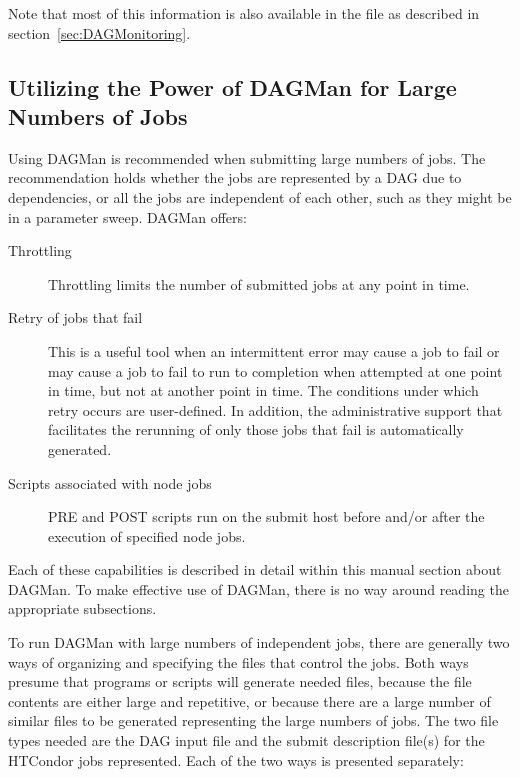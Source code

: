 Note that most of this information is also available in the
 file as described in section~\ref{sec:DAGMonitoring}.

\subsection{\label{sec:DAGLotsaJobs}Utilizing the Power of DAGMan for Large Numbers of Jobs}

Using DAGMan is recommended when submitting large numbers of jobs.
The recommendation holds whether the jobs are represented by
a DAG due to dependencies, or all the jobs are
independent of each other, such as they might be in a parameter sweep.
DAGMan offers:
\begin{description}
\item[Throttling]
  Throttling limits the number of submitted jobs at any point in time.
\item[Retry of jobs that fail]
  This is a useful tool when an intermittent error may cause a job to fail
  or may cause a job to fail to run to completion when attempted at 
  one point in time,
  but not at another point in time.
  The conditions under which retry occurs are user-defined.
  In addition, the administrative support that facilitates the
  rerunning of only those jobs that fail is automatically generated.
\item[Scripts associated with node jobs]
  PRE and POST scripts run on the submit host before and/or after 
  the execution of specified node jobs.
\end{description}

Each of these capabilities is described in detail
within this manual section about DAGMan.
To make effective use of DAGMan, there is no way around reading the 
appropriate subsections.

To run DAGMan with large numbers of independent jobs,
there are generally two ways of organizing and specifying the
files that control the jobs.
Both ways presume that programs or scripts will generate needed files,
because the file contents are either large and repetitive,
or because there are a large number of similar files to be
generated representing the large numbers of jobs.
The two file types needed are the DAG input file and the
submit description file(s) for the HTCondor jobs represented.
Each of the two ways is presented separately:

